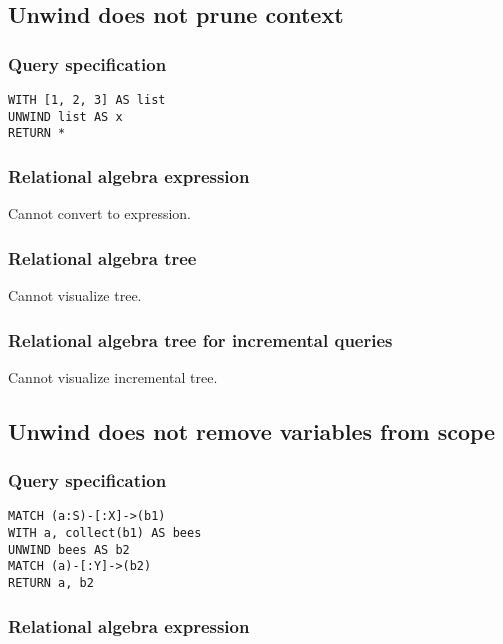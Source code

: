 \subsection{Unwind does not prune context}

\subsubsection*{Query specification}

\begin{lstlisting}
WITH [1, 2, 3] AS list
UNWIND list AS x
RETURN *
\end{lstlisting}

\subsubsection*{Relational algebra expression}

Cannot convert to expression.

\subsubsection*{Relational algebra tree}

Cannot visualize tree.

\subsubsection*{Relational algebra tree for incremental queries}

Cannot visualize incremental tree.

\subsection{Unwind does not remove variables from scope}

\subsubsection*{Query specification}

\begin{lstlisting}
MATCH (a:S)-[:X]->(b1)
WITH a, collect(b1) AS bees
UNWIND bees AS b2
MATCH (a)-[:Y]->(b2)
RETURN a, b2
\end{lstlisting}

\subsubsection*{Relational algebra expression}

